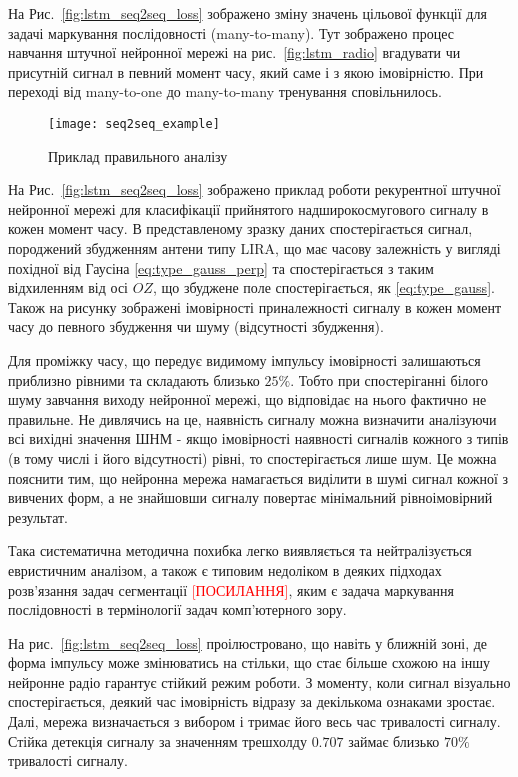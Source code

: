 На Рис.~\ref{fig:lstm_seq2seq_loss} зображено зміну значень цільової функції
для задачі маркування послідовності (many-to-many). Тут зображено процес 
навчання штучної нейронної мережі на рис.~\ref{fig:lstm_radio} вгадувати 
чи присутній сигнал в певний момент часу, який саме і з якою імовірністю.
При переході від many-to-one до many-to-many тренування сповільнилось. 

\begin{figure}[htbp] \begin{center}
\texttt{[image: seq2seq\_example]}
\caption{Приклад правильного аналізу} \label{fig:seq2seq_example}
\end{center} \end{figure}

На Рис.~\ref{fig:lstm_seq2seq_loss} зображено приклад роботи рекурентної 
штучної нейронної мережі для класифікації прийнятого надширокосмугового сигналу 
в кожен момент часу. В представленому зразку даних спостерігається сигнал,
породжений збудженням антени типу LIRA, що має часову залежність у вигляді 
похідної від Гаусіна \eqref{eq:type_gauss_perp} та спостерігається з 
таким відхиленням від осі $ OZ $, що збуджене поле спостерігається, як 
\eqref{eq:type_gauss}. Також на рисунку зображені імовірності приналежності 
сигналу в кожен момент часу до певного збудження чи шуму (відсутності 
збудження).

Для проміжку часу, що передує видимому імпульсу імовірності залишаються 
приблизно рівними та складають близько $ 25 \% $. Тобто при спостеріганні 
білого шуму завчання виходу нейронної мережі, що відповідає на нього 
фактично не правильне. Не дивлячись на це, наявність сигналу можна визначити
аналізуючи всі вихідні значення ШНМ - якщо імовірності наявності сигналів 
кожного з типів (в тому числі і його відсутності) рівні, то спостерігається 
лише шум. Це можна пояснити тим, що нейронна мережа намагається виділити в 
шумі сигнал кожної з вивчених форм, а не знайшовши сигналу повертає 
мінімальний рівноімовірний результат. 

Така систематична методична похибка легко виявляється та нейтралізується 
евристичним аналізом, а також є типовим недоліком в деяких підходах 
розв'язання задач сегментації \textcolor{red}{[ПОСИЛАННЯ]}, яким є задача
маркування послідовності в термінології задач комп'ютерного зору.

На рис.~\ref{fig:lstm_seq2seq_loss} проілюстровано, що навіть у ближній зоні, 
де форма імпульсу може змінюватись на стільки, що стає більше схожою на іншу
нейронне радіо гарантує стійкий режим роботи. З моменту, коли сигнал 
візуально спостерігається, деякий час імовірність відразу за декількома 
ознаками зростає. Далі, мережа визначається з вибором і тримає його весь
час тривалості сигналу. Стійка детекція сигналу за значенням трешхолду 
$ 0.707 $ займає близько $ 70\% $ тривалості сигналу.

